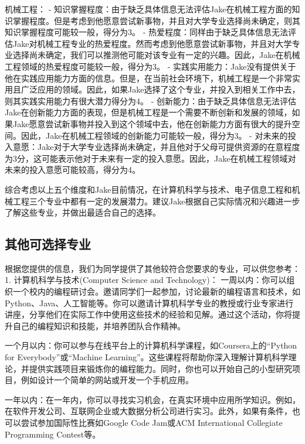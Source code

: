 \documentclass[12pt]{article}
\begin{document}
\begin{CJK*}{UTF8}{gbsn}
机械工程：
- 知识掌握程度：由于缺乏具体信息无法评估Jake在机械工程方面的知识掌握程度。但是考虑到他愿意尝试新事物，并且对大学专业选择尚未确定，则其知识掌握程度可能较一般，得分为3。
- 热爱程度：同样由于缺乏具体信息无法评估Jake对机械工程专业的热爱程度。然而考虑到他愿意尝试新事物，并且对大学专业选择尚未确定，我们可以推测他可能对该专业有一定的兴趣。因此，Jake在机械工程领域的热爱程度可能较一般，得分为3。
- 实践实用能力：Jake没有提供关于他在实践应用能力方面的信息。但是，在当前社会环境下，机械工程是一个非常实用且广泛应用的领域。因此，如果Jake选择了这个专业，并投入到相关工作中去，则其实践实用能力有很大潜力得分为4。
- 创新能力：由于缺乏具体信息无法评估Jake在创新能力方面的表现，但是机械工程是一个需要不断创新和发展的领域，如果Jake愿意尝试新事物并投入到这个领域中去，他在创新能力方面有很大的提升空间。因此，Jake在机械工程领域的创新能力可能较一般，得分为3。
- 对未来的投入意愿：Jake对于大学专业选择尚未确定，并且他对于父母可提供资源的在意程度为3分，这可能表示他对于未来有一定的投入意愿。因此，Jake在机械工程领域对未来的投入意愿可能较高，得分为4。

综合考虑以上五个维度和Jake目前情况，在计算机科学与技术、电子信息工程和机械工程三个专业中都有一定的发展潜力。建议Jake根据自己实际情况和兴趣进一步了解这些专业，并做出最适合自己的选择。
   
   
   
   \newpage
   \hspace{0pt}
   \vspace{0cm}
   \subsection*{其他可选择专业}
   根据您提供的信息，我们为同学提供了其他较符合您要求的专业，可以供您参考：
   1. 计算机科学与技术(Computer Science and Technology)：
一周以内：你可以组织一个校内的编程研讨会。邀请同学们一起参加，讨论最新的编程语言和技术，如Python、Java、人工智能等。你可以邀请计算机科学专业的教授或行业专家进行讲座，分享他们在实际工作中使用这些技术的经验和见解。通过这个活动，你将提升自己的编程知识和技能，并培养团队合作精神。

一个月以内：你可以参与在线平台上的计算机科学课程，如Coursera上的“Python for Everybody”或“Machine Learning”。这些课程将帮助你深入理解计算机科学理论，并提供实践项目来锻炼你的编程能力。同时，你也可以开始自己的小型研究项目，例如设计一个简单的网站或开发一个手机应用。

一年以内：在一年内，你可以寻找实习机会，在真实环境中应用所学知识。例如，在软件开发公司、互联网企业或大数据分析公司进行实习。此外，如果有条件，也可以尝试参加国际性比赛如Google Code Jam或ACM International Collegiate Programming Contest等。


\end{CJK*}
\end{document}
